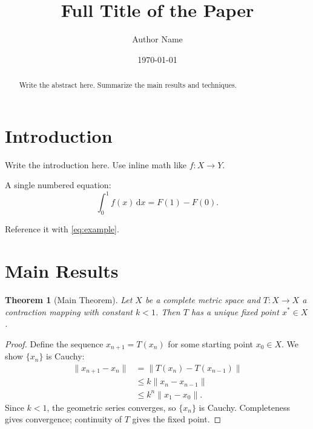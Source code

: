 \documentclass[11pt]{amsart}
\numberwithin{equation}{section}
\theoremstyle{plain}
\newtheorem{thm}{Theorem}[section]
\theoremstyle{definition}
\theoremstyle{remark}
\newcommand{\dd}{\mathrm{d}}
\newcommand{\norm}[1]{\lVert #1 \rVert}
\begin{document}
\title[Short title]{Full Title of the Paper}
\author{Author Name}
\address{Department of Mathematics, University, City, Country}
\date{\today}


\begin{abstract}
Write the abstract here. Summarize the main results and techniques.
\end{abstract}

\maketitle

\section{Introduction}
\label{sec:intro}

Write the introduction here. Use inline math like $f \colon X \to Y$.

A single numbered equation:
\begin{equation}
  \label{eq:example}
  \int_0^1 f(x) \, \dd x = F(1) - F(0).
\end{equation}

Reference it with \eqref{eq:example}.

\section{Main Results}
\label{sec:main}

\begin{thm}[Main Theorem]
  \label{thm:main}
  Let $X$ be a complete metric space and $T \colon X \to X$ a contraction
  mapping with constant $k < 1$. Then $T$ has a unique fixed point $x^* \in X$.
\end{thm}

\begin{proof}
  Define the sequence $x_{n+1} = T(x_n)$ for some starting point $x_0 \in X$.
  We show $\{x_n\}$ is Cauchy:
  \begin{align*}
    \norm{x_{n+1} - x_n}
      &= \norm{T(x_n) - T(x_{n-1})} \\
      &\le k \norm{x_n - x_{n-1}} \\
      &\le k^n \norm{x_1 - x_0}.
  \end{align*}
  Since $k < 1$, the geometric series converges, so $\{x_n\}$ is Cauchy.
  Completeness gives convergence; continuity of $T$ gives the fixed point.
\end{proof}
\end{document}
